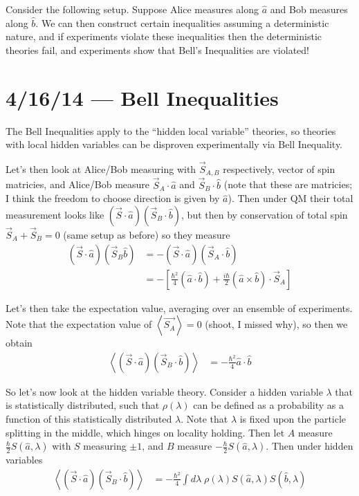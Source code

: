\documentclass[10pt]{report}
\newcommand{\expvalue}[1]{\left<#1\right>}
\begin{document}
Consider the following setup. Suppose Alice measures along $\hat{a}$ and Bob measures along $\hat{b}$. We can then construct certain inequalities assuming a deterministic nature, and if experiments violate these inequalities then the deterministic theories fail, and experiments show that Bell's Inequalities are violated!

\chapter{4/16/14 --- Bell Inequalities}

The Bell Inequalities apply to the ``hidden local variable'' theories, so theories with local hidden variables can be disproven experimentally via Bell Inequality.

Let's then look at Alice/Bob measuring with $\vec{S}_{A,B}$ respectively, vector of spin matricies, and Alice/Bob measure $\vec{S}_A\cdot \hat{a}$ and $\vec{S}_B \cdot \hat{b}$ (note that these are matricies; I think the freedom to choose direction is given by $\hat{a}$). Then under QM their total measurement looks like $(\vec{S}\cdot \hat{a})(\vec{S}_B\cdot\hat{b})$, but then by conservation of total spin $\vec{S}_A + \vec{S}_B = 0$ (same setup as before) so they measure
\begin{align}
    (\vec{S}\cdot \hat{a})(\vec{S}_B\hat{b}) &= -(\vec{S}\cdot \hat{a})(\vec{S}_A\cdot\hat{b})\\
    &= -\left[ \frac{\hbar^2}{4}(\hat{a}\cdot \hat{b}) + \frac{i\hbar}{2}(\hat{a}\times \hat{b})\cdot \vec{S}_A\right]
\end{align}

Let's then take the expectation value, averaging over an ensemble of experiments. Note that the expectation value of $\expvalue{\vec{S_{A}}} = 0$ (shoot, I missed why), so then we obtain
\begin{align}
    \expvalue{(\vec{S}\cdot \hat{a})(\vec{S}_B\cdot\hat{b})} &= -\frac{\hbar^2}{4}\hat{a}\cdot \hat{b}\label{4.16.eq}
\end{align}

So let's now look at the hidden variable theory. Consider a hidden variable $\lambda$ that is statistically distributed, such that $\rho(\lambda)$ can be defined as a probability as a function of this statistically distributed $\lambda$. Note that $\lambda$ is fixed upon the particle splitting in the middle, which hinges on locality holding. Then let $A$ measure $\frac{\hbar}{2}S(\hat{a},\lambda)$ with $S$ measuring $\pm 1$, and $B$ measure $-\frac{\hbar}{2}S(\hat{a},\lambda)$. Then under hidden variables 
\begin{align}
    \expvalue{(\vec{S}\cdot \hat{a})(\vec{S}_B\cdot\hat{b})} &= -\frac{\hbar^2}{4}\int\limits_{}^{}d\lambda\;\rho(\lambda)S(\hat{a},\lambda)S(\hat{b},\lambda)
\end{align}
\end{document}
